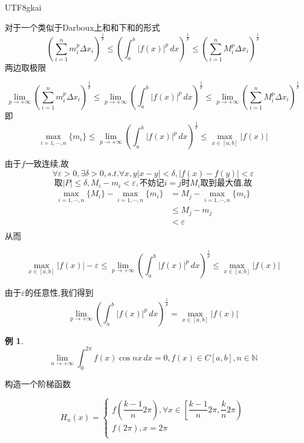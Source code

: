 \documentclass{article}
\newtheorem{example}{例}[subsection]
\newenvironment{cproof}{%
\heiti{证明}\kaishu
}{%
}
\newcommand{\NN}{\mathbb{N}}
\newcommand{\parameter}[1]{\left(#1\right)}
\newcommand{\abs}[1]{\left|#1\right|}
\begin{document}
\begin{CJK}{UTF8}{gkai}
\begin{cproof}
  对于一个类似于Darboux上和和下和的形式
  \[\parameter{\sum_{i = 1}^{n} m_i^p \Delta x_i}^{\frac{1}{p}} \leq  \parameter{\int_{a}^{b} |f(x)|^p \, dx}^{\frac{1}{p}} \leq  \parameter{\sum_{i = 1}^{n} M_i^p \Delta x_i}^{\frac{1}{p}}\]
两边取极限

\[\lim_{p \to +\infty} \parameter{\sum_{i = 1}^{n} m_i^p \Delta x_i}^{\frac{1}{p}} \leq \lim_{p \to + \infty} \parameter{\int_{a}^{b} |f(x)|^p \, dx}^{\frac{1}{p}} \leq \lim_{p \to +\infty} \parameter{\sum_{i = 1}^{n} M_i^p \Delta x_i}^{\frac{1}{p}}\]
即
\[\max_{i = 1,\cdots ,n}\{m_i\} \leq \lim_{p \to + \infty} (\int_{a}^{b} |f(x)|^p \, dx)^{\frac{1}{p}} \leq \max_{x\in[a,b]}\abs{f(x)}\]

由于$f$一致连续,故
\[\forall \varepsilon> 0 ,\exists \delta >0, s.t.\forall x,y |x - y| < \delta , |f(x) - f(y)| < \varepsilon \]
\[\text{取}|P| \leq \delta ,M_i - m_i < \varepsilon ,\text{不妨记}i = j\text{时}M_i\text{取到最大值,故}\]
\[
\begin{aligned}\max_{i = 1,\cdots ,n}\{M_i\} - \max_{i = 1,\cdots ,n}\{m_i\} &= M_j - \max_{i = 1,\cdots ,n}\{m_i\}\\
  &\leq M_j - m_j\\
  &< \varepsilon\\
\end{aligned}  
\]
从而

\[\max_{x\in[a,b]}\abs{f(x)} - \varepsilon \leq \lim_{p \to + \infty} \parameter{\int_{a}^{b} |f(x)|^p \, dx}^{\frac{1}{p}} \leq \max_{x\in[a,b]}\abs{f(x)}\]

由于$\varepsilon$的任意性,我们得到
\[\lim_{p \to + \infty} \parameter{\int_{a}^{b} |f(x)|^p \, dx}^{\frac{1}{p}} = \max_{x\in[a,b]}\abs{f(x)}\]
\end{cproof}

\begin{example}
\[\lim_{n \to +\infty} \int_{0}^{2 \pi} f(x)\cos nx \, dx = 0, f(x) \in C[a,b],n\in \NN\]  
\end{example}


\begin{cproof}
构造一个阶梯函数

\begin{equation*}
  H_n(x) =
  \begin{cases}
    f(\dfrac{k -1}{n}  2\pi),\forall x \in \left[\dfrac{k -1}{n}  2\pi,\dfrac{k}{n} 2\pi\right)\\
    f(2 \pi) , x = 2 \pi\\
  \end{cases}
\end{equation*}


\end{cproof}
\end{CJK}
\end{document}
